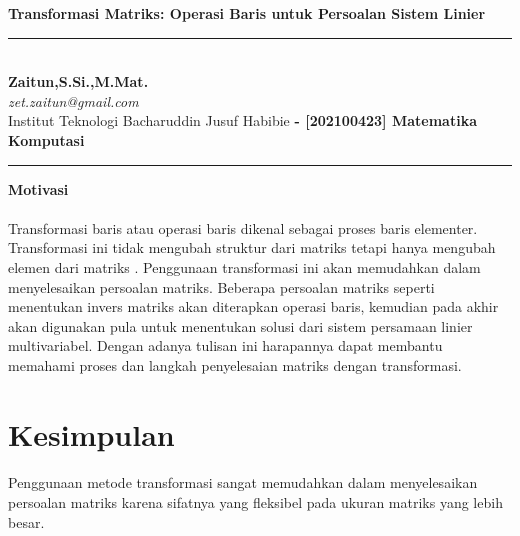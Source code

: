 \documentclass{article}   %
\newcommand{\judul}{Transformasi Matriks: Operasi Baris untuk Persoalan Sistem Linier}
\newcommand{\nama}{Zaitun}
\newcommand{\matkul}{[202100423] Matematika Komputasi}
\newcommand{\asosiasi}{Institut Teknologi Bacharuddin Jusuf Habibie}
\begin{document}
\thispagestyle{empty}
\begin{center}
    \vspace{.4cm}
    \textsf{\textbf { \large \judul}}
\end{center}
\vspace{.4cm}
\hrule
	\textsf{\\
		\textbf{\nama,S.Si.,M.Mat.} \hspace{\fill}
		\textit{\large }\\ [0.7ex]
		\textit{zet.zaitun@gmail.com} \hspace{\fill} \textbf{}\\ [0.7ex]
		\asosiasi \hspace{\fill} \textbf{- \matkul }} \\
	\hrule
\vspace{.4cm}
\begin{center}
\textbf{\Large Motivasi}
\end{center}
\paragraph*{} 
Transformasi baris atau operasi baris dikenal sebagai proses baris elementer. Transformasi ini tidak mengubah struktur dari matriks tetapi hanya mengubah elemen dari matriks \textbf{\cite{zz}}. Penggunaan transformasi ini akan memudahkan dalam menyelesaikan persoalan matriks. Beberapa persoalan matriks seperti menentukan invers matriks akan diterapkan operasi baris, kemudian pada akhir akan digunakan pula untuk menentukan solusi dari sistem persamaan linier multivariabel. Dengan adanya tulisan ini harapannya dapat membantu memahami proses dan langkah penyelesaian matriks dengan transformasi.




\section{Kesimpulan}
\paragraph*{} Penggunaan metode transformasi sangat memudahkan dalam menyelesaikan persoalan matriks karena sifatnya yang fleksibel pada ukuran matriks yang lebih besar. 



\end{document}
